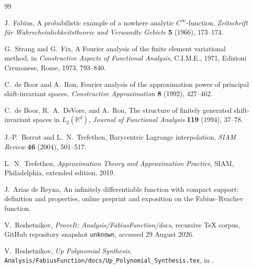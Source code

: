 \documentclass[11pt,oneside]{book}
\newcommand{\RepoCommit}{\texttt{unknown}}%
\theoremstyle{definition}
\theoremstyle{remark}
\newcommand{\RepoPath}[1]{\texttt{#1}}
\begin{document}
\backmatter
\begin{thebibliography}{99}

J.~Fabius,
\newblock A probabilistic example of a nowhere analytic \(C^\infty\)-function,
\newblock \emph{Zeitschrift f\"ur Wahrscheinlichkeitstheorie und Verwandte Gebiete} \textbf{5} (1966), 173--174.

G.~Strang and G.~Fix,
\newblock A Fourier analysis of the finite element variational method,
\newblock in \emph{Constructive Aspects of Functional Analysis}, C.I.M.E., 1971, Edizioni Cremonese, Rome, 1973, 793--840.

C.~de Boor and A.~Ron,
\newblock Fourier analysis of the approximation power of principal shift-invariant spaces,
\newblock \emph{Constructive Approximation} \textbf{8} (1992), 427--462.

C.~de Boor, R.~A.~DeVore, and A.~Ron,
\newblock The structure of finitely generated shift-invariant spaces in \(L_2(\mathbb R^d)\),
\newblock \emph{Journal of Functional Analysis} \textbf{119} (1994), 37--78.

J.-P.~Berrut and L.~N.~Trefethen,
\newblock Barycentric Lagrange interpolation,
\newblock \emph{SIAM Review} \textbf{46} (2004), 501--517.

L.~N.~Trefethen,
\newblock \emph{Approximation Theory and Approximation Practice},
\newblock SIAM, Philadelphia, extended edition, 2019.

J.~Arias de Reyna,
\newblock An infinitely differentiable function with compact support: definition and properties,
\newblock online preprint and exposition on the Fabius--Rvachev function.

V.~Reshetnikov,
\newblock \emph{ProveIt: Analysis/FabiusFunction/docs}, recursive TeX corpus,
\newblock GitHub repository snapshot \RepoCommit, accessed 29 August 2026.

V.~Reshetnikov,
\newblock \emph{Up Polynomial Synthesis},
\newblock \RepoPath{Analysis/FabiusFunction/docs/Up\_Polynomial\_Synthesis.tex}, in \cite{ProveItCorpus}.

\end{thebibliography}
\end{document}
